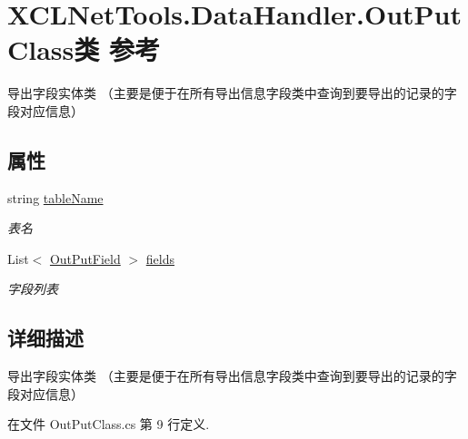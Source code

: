 \hypertarget{class_x_c_l_net_tools_1_1_data_handler_1_1_out_put_class}{\section{X\-C\-L\-Net\-Tools.\-Data\-Handler.\-Out\-Put\-Class类 参考}
\label{class_x_c_l_net_tools_1_1_data_handler_1_1_out_put_class}
}


导出字段实体类 （主要是便于在所有导出信息字段类中查询到要导出的记录的字段对应信息）  


\subsection*{属性}
\begin{DoxyCompactItemize}
\item 
string \hyperlink{class_x_c_l_net_tools_1_1_data_handler_1_1_out_put_class_aef1df865588230b66b506058970e8894}{table\-Name}
\begin{DoxyCompactList}\small\item\em 表名 \end{DoxyCompactList}\item 
List$<$ \hyperlink{class_x_c_l_net_tools_1_1_data_handler_1_1_out_put_field}{Out\-Put\-Field} $>$ \hyperlink{class_x_c_l_net_tools_1_1_data_handler_1_1_out_put_class_aaa38718d249736e2070ab87f10a829ae}{fields}
\begin{DoxyCompactList}\small\item\em 字段列表 \end{DoxyCompactList}\end{DoxyCompactItemize}


\subsection{详细描述}
导出字段实体类 （主要是便于在所有导出信息字段类中查询到要导出的记录的字段对应信息） 



在文件 Out\-Put\-Class.\-cs 第 9 行定义.



